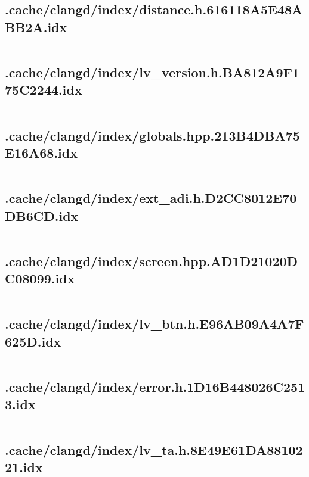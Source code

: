\subsection{.cache/clangd/index/distance.h.616118A5E48ABB2A.idx}
\inputminted[linenos,tabsize=2,breaklines, breakanywhere]{c}{distance.h.616118A5E48ABB2A.idx}
\pagebreak

\subsection{.cache/clangd/index/lv_version.h.BA812A9F175C2244.idx}
\inputminted[linenos,tabsize=2,breaklines, breakanywhere]{c}{lv_version.h.BA812A9F175C2244.idx}
\pagebreak

\subsection{.cache/clangd/index/globals.hpp.213B4DBA75E16A68.idx}
\inputminted[linenos,tabsize=2,breaklines, breakanywhere]{c}{globals.hpp.213B4DBA75E16A68.idx}
\pagebreak

\subsection{.cache/clangd/index/ext_adi.h.D2CC8012E70DB6CD.idx}
\inputminted[linenos,tabsize=2,breaklines, breakanywhere]{c}{ext_adi.h.D2CC8012E70DB6CD.idx}
\pagebreak

\subsection{.cache/clangd/index/screen.hpp.AD1D21020DC08099.idx}
\inputminted[linenos,tabsize=2,breaklines, breakanywhere]{c}{screen.hpp.AD1D21020DC08099.idx}
\pagebreak

\subsection{.cache/clangd/index/lv_btn.h.E96AB09A4A7F625D.idx}
\inputminted[linenos,tabsize=2,breaklines, breakanywhere]{c}{lv_btn.h.E96AB09A4A7F625D.idx}
\pagebreak

\subsection{.cache/clangd/index/error.h.1D16B448026C2513.idx}
\inputminted[linenos,tabsize=2,breaklines, breakanywhere]{c}{error.h.1D16B448026C2513.idx}
\pagebreak

\subsection{.cache/clangd/index/lv_ta.h.8E49E61DA8810221.idx}
\inputminted[linenos,tabsize=2,breaklines, breakanywhere]{c}{lv_ta.h.8E49E61DA8810221.idx}
\pagebreak

